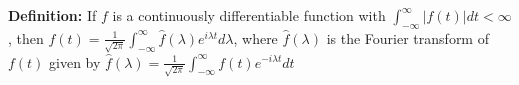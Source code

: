 {\bf Definition:} If $f$ is a continuously differentiable function with $\int_{-\infty}^{\infty}|f(t)|dt<\infty$, then $f(t)=\frac{1}{\sqrt{2\pi}}\int_{-\infty}^{\infty}\hat{f}(\lambda)e^{i\lambda t}d\lambda$, where $\hat{f}(\lambda)$ is the Fourier transform of $f(t)$ given by $\hat{f}(\lambda)=\frac{1}{\sqrt{2\pi}}\int_{-\infty}^{\infty}f(t)e^{-i\lambda t}dt$